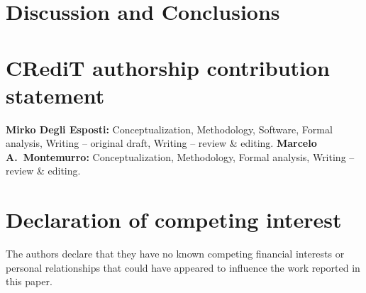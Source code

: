 \documentclass[preprint]{elsarticle}
\newcommand{\TODO}[1]{\textcolor{red}{\textbf{[TODO: #1]}}}
\newcommand{\NOTE}[1]{\textcolor{blue}{\textbf{[NOTE: #1]}}}
\begin{document}
\FloatBarrier
\section{Discussion and Conclusions}
\label{sec:discussion}

%
%


\section*{CRediT authorship contribution statement}
\textbf{Mirko Degli Esposti:} Conceptualization, Methodology, Software,
Formal analysis, Writing -- original draft, Writing -- review \& editing.
\textbf{Marcelo A.\ Montemurro:} Conceptualization, Methodology,
Formal analysis, Writing -- review \& editing.
 
\section*{Declaration of competing interest}
The authors declare that they have no known competing financial
interests or personal relationships that could have appeared to
influence the work reported in this paper.
 
\end{document}
